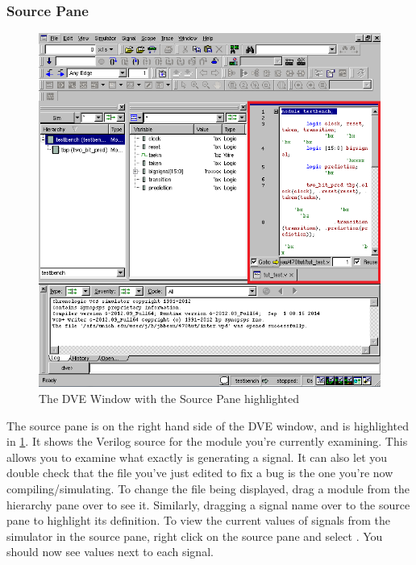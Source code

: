 \documentclass[dvipsnames]{article}
\begin{document}
\subsubsection{Source Pane}
\begin{figure}[H]
    \begin{center}
	\includegraphics[scale=0.85]{source-pane}
	\caption{The DVE Window with the Source Pane highlighted}
	\label{fig:source-pane}
	\end{center}
\end{figure}

The source pane is on the right hand side of the DVE window, and is highlighted
in \cref{fig:source-pane}. It shows the Verilog source for the module you're
currently examining. This allows you to examine what exactly is generating a
signal. It can also let you double check that the file you've just edited to fix
a bug is the one you're now compiling/simulating. To change the file being
displayed, drag a module from the hierarchy pane over to see it. Similarly,
dragging a signal name over to the source pane to highlight its definition. To
view the current values of signals from the simulator in the source pane, right
click on the source pane and select . You should now see
values next to each signal.
\end{document}

